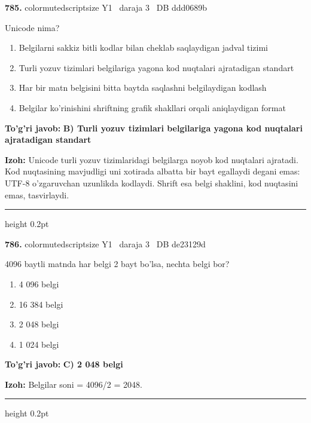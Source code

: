 \documentclass[10pt,a4paper,oneside]{article}
\begin{document}
\noindent\textbf{\color{ink}785.}  {color{muted}scriptsize Y1 \textbullet\ daraja 3 \textbullet\ DB ddd0689b}
\par
Unicode nima?
\begin{enumerate}[label=\Alph*),leftmargin=9mm]
\item Belgilarni sakkiz bitli kodlar bilan cheklab saqlaydigan jadval tizimi
\item Turli yozuv tizimlari belgilariga yagona kod nuqtalari ajratadigan standart
\item Har bir matn belgisini bitta baytda saqlashni belgilaydigan kodlash
\item Belgilar ko'rinishini shriftning grafik shakllari orqali aniqlaydigan format
\end{enumerate}
\begin{tcolorbox}[enhanced,breakable,colback=teal!4,colframe=teal!50!black,boxrule=0.5pt,arc=1.1mm,left=3mm,right=3mm,top=1.7mm,bottom=1.7mm,before skip=2mm,after skip=2mm]
\textbf{\color{teal}To'g'ri javob:} \textbf{B) Turli yozuv tizimlari belgilariga yagona kod nuqtalari ajratadigan standart}
\par\smallskip
\textbf{Izoh:} Unicode turli yozuv tizimlaridagi belgilarga noyob kod nuqtalari ajratadi. Kod nuqtasining mavjudligi uni xotirada albatta bir bayt egallaydi degani emas: UTF-8 o'zgaruvchan uzunlikda kodlaydi. Shrift esa belgi shaklini, kod nuqtasini emas, tasvirlaydi.
\end{tcolorbox}
\vspace{2mm}\hrule height 0.2pt \vspace{3mm}

\noindent\textbf{\color{ink}786.}  {color{muted}scriptsize Y1 \textbullet\ daraja 3 \textbullet\ DB de23129d}
\par
4096 baytli matnda har belgi 2 bayt bo'lsa, nechta belgi bor?
\begin{enumerate}[label=\Alph*),leftmargin=9mm]
\item 4 096 belgi
\item 16 384 belgi
\item 2 048 belgi
\item 1 024 belgi
\end{enumerate}
\begin{tcolorbox}[enhanced,breakable,colback=teal!4,colframe=teal!50!black,boxrule=0.5pt,arc=1.1mm,left=3mm,right=3mm,top=1.7mm,bottom=1.7mm,before skip=2mm,after skip=2mm]
\textbf{\color{teal}To'g'ri javob:} \textbf{C) 2 048 belgi}
\par\smallskip
\textbf{Izoh:} Belgilar soni = 4096/2 = 2048.
\end{tcolorbox}
\vspace{2mm}\hrule height 0.2pt \vspace{3mm}
\end{document}
